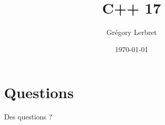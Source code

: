 \documentclass[t, 10pt,french]{beamer}
\author{Grégory Lerbret}
\title{C++ 17}
\date{\today}
\begin{document}
\frame[plain]{\maketitle}



\section*{Questions}
\begin{frame}[c]
	\begin{center}
		\huge Des questions ?
	\end{center}
\end{frame}


\end{document}
